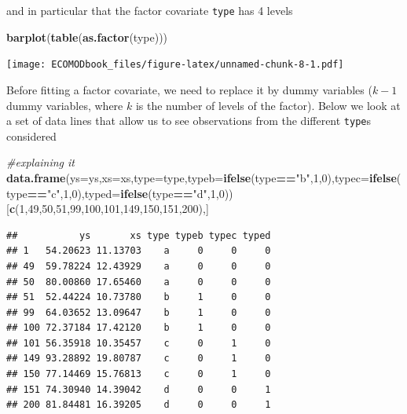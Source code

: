 \documentclass[
]{book}
\newenvironment{Shaded}{\begin{snugshade}}{\end{snugshade}}
\newcommand{\AttributeTok}[1]{\textcolor[rgb]{0.13,0.29,0.53}{#1}}
\newcommand{\CommentTok}[1]{\textcolor[rgb]{0.56,0.35,0.01}{\textit{#1}}}
\newcommand{\DecValTok}[1]{\textcolor[rgb]{0.00,0.00,0.81}{#1}}
\newcommand{\FunctionTok}[1]{\textcolor[rgb]{0.13,0.29,0.53}{\textbf{#1}}}
\newcommand{\NormalTok}[1]{#1}
\newcommand{\SpecialCharTok}[1]{\textcolor[rgb]{0.81,0.36,0.00}{\textbf{#1}}}
\newcommand{\StringTok}[1]{\textcolor[rgb]{0.31,0.60,0.02}{#1}}
\begin{document}
and in particular that the factor covariate \texttt{type} has 4 levels

\begin{Shaded}
\begin{Highlighting}[]
\FunctionTok{barplot}\NormalTok{(}\FunctionTok{table}\NormalTok{(}\FunctionTok{as.factor}\NormalTok{(type)))}
\end{Highlighting}
\end{Shaded}

\texttt{[image: ECOMODbook\_files/figure-latex/unnamed-chunk-8-1.pdf]}

Before fitting a factor covariate, we need to replace it by dummy variables (\(k-1\) dummy variables, where \(k\) is the number of levels of the factor). Below we look at a set of data lines that allow us to see observations from the different \texttt{type}s considered

\begin{Shaded}
\begin{Highlighting}[]
\CommentTok{\#explaining it}
\FunctionTok{data.frame}\NormalTok{(}\AttributeTok{ys=}\NormalTok{ys,}\AttributeTok{xs=}\NormalTok{xs,}\AttributeTok{type=}\NormalTok{type,}\AttributeTok{typeb=}\FunctionTok{ifelse}\NormalTok{(type}\SpecialCharTok{==}\StringTok{"b"}\NormalTok{,}\DecValTok{1}\NormalTok{,}\DecValTok{0}\NormalTok{),}\AttributeTok{typec=}\FunctionTok{ifelse}\NormalTok{(type}\SpecialCharTok{==}\StringTok{"c"}\NormalTok{,}\DecValTok{1}\NormalTok{,}\DecValTok{0}\NormalTok{),}\AttributeTok{typed=}\FunctionTok{ifelse}\NormalTok{(type}\SpecialCharTok{==}\StringTok{"d"}\NormalTok{,}\DecValTok{1}\NormalTok{,}\DecValTok{0}\NormalTok{))[}\FunctionTok{c}\NormalTok{(}\DecValTok{1}\NormalTok{,}\DecValTok{49}\NormalTok{,}\DecValTok{50}\NormalTok{,}\DecValTok{51}\NormalTok{,}\DecValTok{99}\NormalTok{,}\DecValTok{100}\NormalTok{,}\DecValTok{101}\NormalTok{,}\DecValTok{149}\NormalTok{,}\DecValTok{150}\NormalTok{,}\DecValTok{151}\NormalTok{,}\DecValTok{200}\NormalTok{),]}
\end{Highlighting}
\end{Shaded}

\begin{verbatim}
##           ys       xs type typeb typec typed
## 1   54.20623 11.13703    a     0     0     0
## 49  59.78224 12.43929    a     0     0     0
## 50  80.00860 17.65460    a     0     0     0
## 51  52.44224 10.73780    b     1     0     0
## 99  64.03652 13.09647    b     1     0     0
## 100 72.37184 17.42120    b     1     0     0
## 101 56.35918 10.35457    c     0     1     0
## 149 93.28892 19.80787    c     0     1     0
## 150 77.14469 15.76813    c     0     1     0
## 151 74.30940 14.39042    d     0     0     1
## 200 81.84481 16.39205    d     0     0     1
\end{verbatim}
\end{document}
